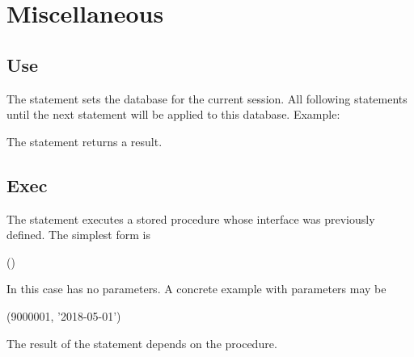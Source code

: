 \section{Miscellaneous}
\subsection{Use}
The  statement sets the database for
the current session. All following statements
 until the next  statement
will be applied to this database.
Example:

 

The statement returns a  result.

\subsection{Exec}
The  statement executes a stored procedure
whose interface was previously defined.
The simplest form is

 ()

In this case  has no parameters.
A concrete example with parameters may be

 (9000001, '2018-05-01')

The result of the statement depends on the procedure.
